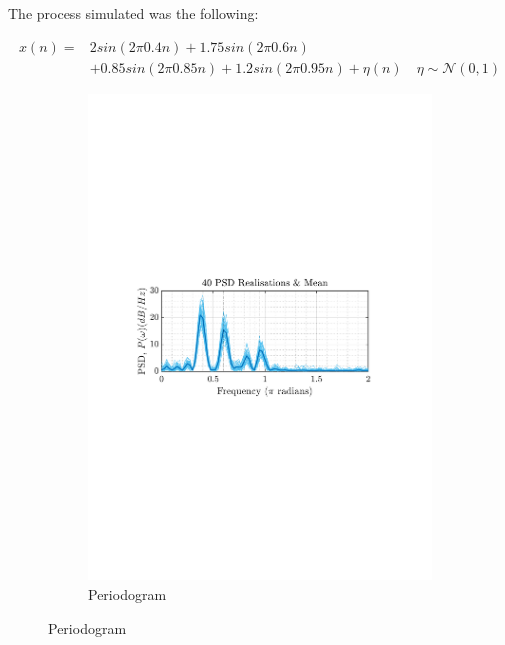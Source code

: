 \documentclass[12pt]{article}
\begin{document}
	The process simulated was the following:
	
	\begin{equation}
		\begin{aligned}
		x(n) = & 2 sin(2 \pi 0.4 n) + 1.75 sin(2 \pi 0.6 n) \\
		&  + 0.85 sin(2 \pi 0.85 n) + 1.2 sin(2 \pi 0.95 n) + \eta(n) \quad \eta \sim \mathcal{N}(0, 1)
		\end{aligned}
	\end{equation}
	
	

	\begin{figure}[H]
		\centering
		\begin{subfigure}{0.49\textwidth}
			\centering
			\includegraphics[trim={2.2cm 11.2cm 3.15cm  11.2cm}, clip, width=\textwidth]{../MATLAB/figures/q1_3b_fig01.pdf} 
			\captionsetup{justification=centering}
			\caption{Periodogram}

\end{subfigure}
\end{figure}
\end{document}
